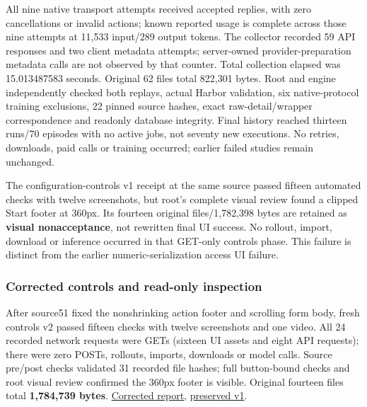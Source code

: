 \documentclass[
  11pt,
  letterpaper,
]{article}
\begin{document}
All nine native transport attempts received accepted replies, with zero
cancellations or invalid actions; known reported usage is complete
across those nine attempts at 11,533 input/289 output tokens. The
collector recorded 59 API responses and two client metadata attempts;
server-owned provider-preparation metadata calls are not observed by
that counter. Total collection elapsed was 15.013487583 seconds.
Original 62 files total 822,301 bytes. Root and engine independently
checked both replays, actual Harbor validation, six native-protocol
training exclusions, 22 pinned source hashes, exact raw-detail/wrapper
correspondence and readonly database integrity. Final history reached
thirteen runs/70 episodes with no active jobs, not seventy new
executions. No retries, downloads, paid calls or training occurred;
earlier failed studies remain unchanged.

The configuration-controls v1 receipt at the same source passed fifteen
automated checks with twelve screenshots, but root's complete visual
review found a clipped Start footer at 360px. Its fourteen original
files/1,782,398 bytes are retained as \textbf{visual nonacceptance}, not
rewritten final UI success. No rollout, import, download or inference
occurred in that GET-only controls phase. This failure is distinct from
the earlier numeric-serialization access UI failure.

\subsubsection{Corrected controls and read-only
inspection}\label{corrected-controls-and-read-only-inspection}

After source51 fixed the nonshrinking action footer and scrolling form
body, fresh controls v2 passed fifteen checks with twelve screenshots
and one video. All 24 recorded network requests were GETs (sixteen UI
assets and eight API requests); there were zero POSTs, rollouts,
imports, downloads or model calls. Source pre/post checks validated 31
recorded file hashes; full button-bound checks and root visual review
confirmed the 360px footer is visible. Original fourteen files total
\textbf{1,784,739 bytes}.
\href{../../artifacts/native-controls-qa/20261010-v2/report.json}{Corrected
report},
\href{../../artifacts/native-controls-qa/20261010-v1/report.json}{preserved
v1}.
\end{document}
